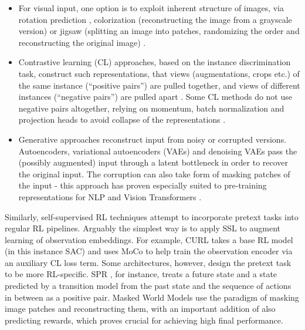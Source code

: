\documentclass[en]{pracamgr}
\begin{document}
\begin{itemize}
  \item For visual input, one option is to exploit inherent structure of images, via rotation prediction \autocite{gidarisUnsupervisedRepresentationLearning2018}, colorization (reconstructing the image from a grayscale version) \autocite{zhangColorfulImageColorization2016} or jigsaw (splitting an image into patches, randomizing the order and reconstructing the original image) \autocite{norooziUnsupervisedLearningVisual2017}.
  \item Contrastive learning (CL) approaches, based on the instance discrimination task, construct such representations, that views (augmentations, crops etc.) of the same instance (``positive pairs'') are pulled together, and views of different instances (``negative pairs'') are pulled apart \autocite{chopraLearningSimilarityMetric2005,schroffFaceNetUnifiedEmbedding2015}. Some CL methods do not use negative pairs altogether, relying on momentum, batch normalization and projection heads to avoid collapse of the representations \autocite{grillBootstrapYourOwn2020}.
  \item Generative approaches reconstruct input from noisy or corrupted versions. Autoencoders, variational autoencoders (VAEs) and denoising VAEs \autocite{inproceedings} pass the (possibly augmented) input through a latent bottleneck in order to recover the original input. The corruption can also take form of masking patches of the input - this approach has proven especially suited to pre-training representations for NLP \autocite{devlinBERTPretrainingDeep2019} and Vision Transformers \autocite{heMaskedAutoencodersAre2021}.
\end{itemize}

Similarly, self-supervised RL techniques attempt to incorporate pretext tasks into regular RL pipelines. Arguably the simplest way is to apply SSL to augment learning of observation embeddings. For example, CURL \autocite{srinivasCURLContrastiveUnsupervised2020} takes a base RL model (in this instance SAC) and uses MoCo \autocite{heMomentumContrastUnsupervised2020} to help train the observation encoder via an auxiliary CL loss term. Some architectures, however, design the pretext task to be more RL-specific. SPR \autocite{schwarzerDataEfficientReinforcementLearning2021}, for instance, treats a future state and a state predicted by a transition model from the past state and the sequence of actions in between as a positive pair. Masked World Models \autocite{seoMaskedWorldModels2022} use the paradigm of masking image patches and reconstructing them, with an important addition of also predicting rewards, which proves crucial for achieving high final performance.
\end{document}
